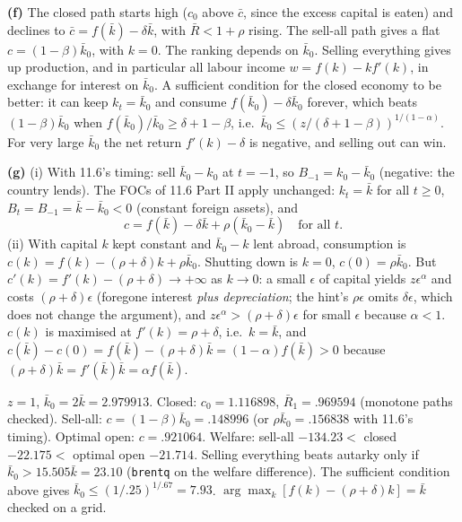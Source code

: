 \documentclass[12pt, letterpaper]{article}
\newcommand{\Rb}{\bar R}
\newcommand{\kb}{\bar k}
\newcommand{\cb}{\bar c}
\begin{document}
\begin{tcolorbox}[evenbox,title={Exercise 11.8 \quad Trade and growth, version II}]
\textbf{(f)} The closed path starts high ($c_0$ above $\cb$, since the excess capital is eaten) and declines to
$\cb=f(\kb)-\delta\kb$, with $\Rb<1+\rho$ rising. The sell-all path gives a flat $c=(1-\beta)\kb_0$, with $k=0$. The ranking
depends on $\kb_0$. Selling everything gives up production, and in particular all labour income $w=f(k)-kf'(k)$, in
exchange for interest on $\kb_0$. A sufficient condition for the closed economy to be better: it can keep $k_t=\kb_0$ and
consume $f(\kb_0)-\delta\kb_0$ forever, which beats $(1-\beta)\kb_0$ when $f(\kb_0)/\kb_0\ge\delta+1-\beta$, i.e.\
$\kb_0\le(z/(\delta+1-\beta))^{1/(1-\alpha)}$. For very large $\kb_0$ the net return $f'(k)-\delta$ is negative, and
selling out can win.

\textbf{(g)} (i) With 11.6's timing: sell $\kb_0-k_0$ at $t=-1$, so $B_{-1}=k_0-\kb_0$ (negative: the country lends). The
FOCs of 11.6 Part II apply unchanged: $k_t=\kb$ for all $t\ge0$, $B_t=B_{-1}=\kb-\kb_0<0$ (constant foreign assets), and
\[
c=f(\kb)-\delta\kb+\rho(\kb_0-\kb)\quad\text{for all }t .
\]
(ii) With capital $k$ kept constant and $\kb_0-k$ lent abroad, consumption is
$c(k)=f(k)-(\rho+\delta)k+\rho\kb_0$. Shutting down is $k=0$, $c(0)=\rho\kb_0$. But $c'(k)=f'(k)-(\rho+\delta)\to+\infty$
as $k\to0$: a small $\epsilon$ of capital yields $z\epsilon^\alpha$ and costs $(\rho+\delta)\epsilon$ (foregone interest
\emph{plus depreciation}; the hint's $\rho\epsilon$ omits $\delta\epsilon$, which does not change the argument), and
$z\epsilon^\alpha>(\rho+\delta)\epsilon$ for small $\epsilon$ because $\alpha<1$. $c(k)$ is maximised at $f'(k)=\rho+\delta$,
i.e.\ $k=\kb$, and $c(\kb)-c(0)=f(\kb)-(\rho+\delta)\kb=(1-\alpha)f(\kb)>0$ because $(\rho+\delta)\kb=f'(\kb)\kb=\alpha f(\kb)$.

\begin{tcolorbox}[databox]
$z=1$, $\kb_0=2\kb=2.979913$. Closed: $c_0=1.116898$, $\Rb_1=.969594$ (monotone paths checked). Sell-all:
$c=(1-\beta)\kb_0=.148996$ (or $\rho\kb_0=.156838$ with 11.6's timing). Optimal open: $c=.921064$. Welfare:
sell-all $-134.23<$ closed $-22.175<$ optimal open $-21.714$. Selling everything beats autarky only if
$\kb_0>15.505\kb=23.10$ (\texttt{brentq} on the welfare difference). The sufficient condition above gives
$\kb_0\le(1/.25)^{1/.67}=7.93$. $\arg\max_k[f(k)-(\rho+\delta)k]=\kb$ checked on a grid.
\end{tcolorbox}
\end{tcolorbox}
\end{document}
